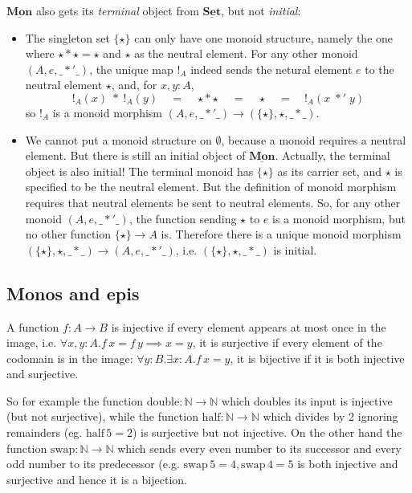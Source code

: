 \documentclass{article}
\newcommand{\cat}[1]{\underline{\mathbf{#1}}}
\newcommand{\Nat}{\mathbb{N}}
\newcommand{\half}{\mathrm{half}}
\newcommand{\double}{\mathrm{double}}
\newcommand{\swap}{\mathrm{swap}}
\begin{document}
\begin{Answer}
  $\cat{Mon}$ also gets its \emph{terminal} object from $\cat{Set}$, but not \emph{initial}:
  \begin{itemize}
    \item The singleton set $\{\star\}$ can only have one monoid structure, namely the one where $\star * \star = \star$ and $\star$ as the neutral element. For any other monoid $(A,e,\_*'\_)$, the unique map $!_A$ indeed sends the netural element $e$ to the neutral element $\star$, and, for $x,y\colon A$,
    \[ !_A(x)\;*\;!_A(y) \quad=\quad \star * \star \quad=\quad \star \quad=\quad !_A(x\;*'\;y) \]
    so $!_A$ is a monoid morphism $(A,e,\_*'\_) \to (\{\star\},\star,\_*\_)$.
    \item We cannot put a monoid structure on $\emptyset$, because a monoid requires a neutral element. But there is still an initial object of $\cat{Mon}$. Actually, the terminal object is also initial! The terminal monoid has $\{\star\}$ as its carrier set, and $\star$ is specified to be the neutral element. But the definition of monoid morphism requires that neutral elements be sent to neutral elements. So, for any other monoid $(A,e,\_*'\_)$, the function sending $\star$ to $e$ is a monoid morphism, but no other function $\{\star\}\to A$ is. Therefore there is a unique monoid morphism $(\{\star\},\star,\_*\_)\to (A,e,\_*'\_)$, i.e. $(\{\star\},\star,\_*\_)$ is initial.
  \end{itemize}
\end{Answer}

\subsection{Monos and epis}
\label{sec:monos-epis}

A function $f:A\to B$ is injective if every element appears at most once in the image, i.e. $\forall x,y:A.f\,x = f\,y \implies x = y$, it is surjective if every element of the codomain is in the image: $\forall y:B.\exists x:A.f\,x = y$, it is bijective if it is both injective and surjective. 

So for example the function $\double : \Nat \to \Nat$ which doubles its input is injective (but not surjective), while the function $\half : \Nat \to \Nat$ which divides by 2 ignoring remainders (eg. $\half\,5 = 2$) is surjective but not injective. On the other hand the function $\swap : \Nat \to \Nat$ which sends every even number to its successor and every odd number to its predecessor (e.g. $\swap\,5 = 4, \swap\,4 = 5$ is both injective and surjective and hence it is a bijection.  
\end{document}
